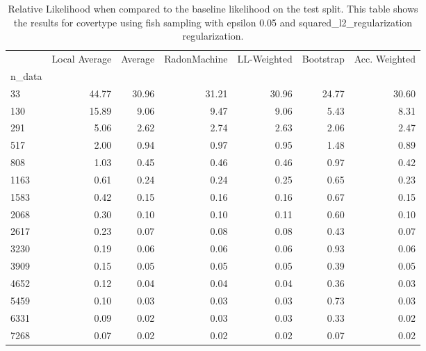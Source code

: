 \begin{table}
\centering
\caption{Relative Likelihood when compared to the baseline likelihood on the test split. This table shows the results for  covertype using  fish sampling with epsilon  0.05 and  squared_l2_regularization regularization.}
\label{tab:7}
\begin{tabular}{lrrrrrr}
\toprule
{} &  Local Average &  Average &  RadonMachine &  LL-Weighted &  Bootstrap &  Acc. Weighted \\
n\_data &                &          &               &              &            &                \\
\midrule
33     &          44.77 &    30.96 &         31.21 &        30.96 &      24.77 &          30.60 \\
130    &          15.89 &     9.06 &          9.47 &         9.06 &       5.43 &           8.31 \\
291    &           5.06 &     2.62 &          2.74 &         2.63 &       2.06 &           2.47 \\
517    &           2.00 &     0.94 &          0.97 &         0.95 &       1.48 &           0.89 \\
808    &           1.03 &     0.45 &          0.46 &         0.46 &       0.97 &           0.42 \\
1163   &           0.61 &     0.24 &          0.24 &         0.25 &       0.65 &           0.23 \\
1583   &           0.42 &     0.15 &          0.16 &         0.16 &       0.67 &           0.15 \\
2068   &           0.30 &     0.10 &          0.10 &         0.11 &       0.60 &           0.10 \\
2617   &           0.23 &     0.07 &          0.08 &         0.08 &       0.43 &           0.07 \\
3230   &           0.19 &     0.06 &          0.06 &         0.06 &       0.93 &           0.06 \\
3909   &           0.15 &     0.05 &          0.05 &         0.05 &       0.39 &           0.05 \\
4652   &           0.12 &     0.04 &          0.04 &         0.04 &       0.36 &           0.03 \\
5459   &           0.10 &     0.03 &          0.03 &         0.03 &       0.73 &           0.03 \\
6331   &           0.09 &     0.02 &          0.03 &         0.03 &       0.33 &           0.02 \\
7268   &           0.07 &     0.02 &          0.02 &         0.02 &       0.07 &           0.02 \\
\bottomrule
\end{tabular}
\end{table}
